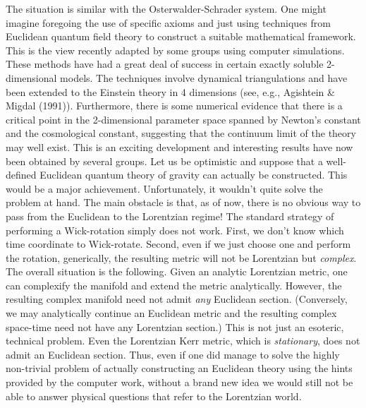 The situation is similar with the Osterwalder-Schrader system. One might
imagine foregoing the use of specific axioms and just using techniques from
Euclidean quantum field theory to construct a suitable mathematical framework.
This is the view recently adapted by some groups using computer simulations.
These methods
have had a great deal of success in certain exactly soluble 2-dimensional
models. The techniques involve dynamical triangulations and have been
extended to the Einstein theory in 4 dimensions (see, e.g., Agishtein \&
Migdal (1991)). Furthermore, there is some numerical evidence that there is
a critical point in the 2-dimensional parameter space spanned by Newton's
constant and the cosmological constant, suggesting that the continuum limit of
the theory may well exist. This is an exciting development and interesting
results have now been obtained by several groups. Let us be optimistic and
suppose that a well-defined Euclidean quantum theory of gravity can actually
be constructed. This would be a major achievement. Unfortunately, it wouldn't
quite solve the problem at hand. The main obstacle is that, as of now, there
is no obvious way to pass from the Euclidean to the Lorentzian regime! The
standard strategy of performing a Wick-rotation simply does not work. First,
we don't know which time coordinate to Wick-rotate. Second, even if we just
choose one and perform the rotation, generically, the resulting metric will
not be Lorentzian but {\it complex}. The overall situation is the following.
Given an analytic Lorentzian metric, one can complexify the manifold and
extend the
metric analytically. However, the resulting complex manifold need not admit
{\it any} Euclidean section. (Conversely, we may analytically continue an
Euclidean metric and the resulting complex space-time need not have any
Lorentzian section.) This is not just an esoteric, technical problem. Even
the Lorentzian Kerr metric, which is {\it stationary}, does not admit an
Euclidean section. Thus, even if one did manage to solve the highly
non-trivial problem of actually constructing an Euclidean theory using the
hints provided by the computer work, without a brand new idea we would still
not be able to answer physical questions that refer to the Lorentzian world.

